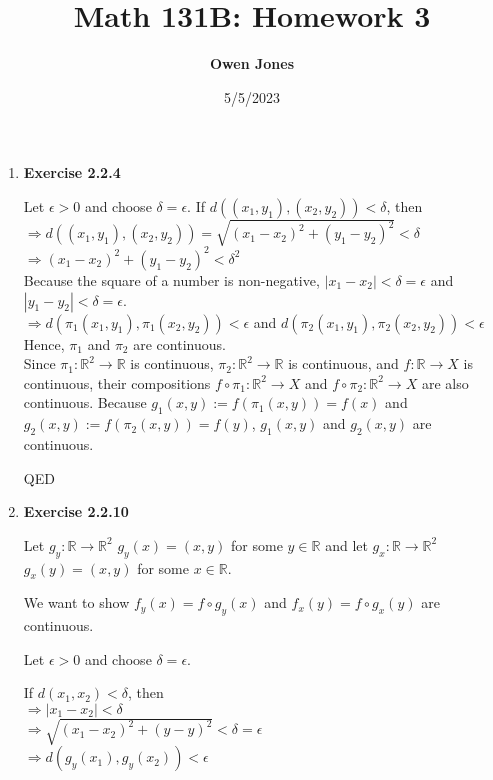 \documentclass[10pt]{article}
\title{\bf Math 131B: Homework 3}
\date{5/5/2023}
\author{\bf Owen Jones}
\begin{document}
\maketitle
\begin{enumerate}[label=Problem \arabic*.]
    \item \textbf{Exercise 2.2.4}\par 
        Let $\epsilon>0$ and choose $\delta=\epsilon$.
        If $d((x_1,y_1),(x_2,y_2))<\delta$, then\\ 
        $\Rightarrow d((x_1,y_1),(x_2,y_2))=\sqrt{(x_1-x_2)^2+(y_1-y_2)^2}<\delta$\\
        $\Rightarrow (x_1-x_2)^2+(y_1-y_2)^2<\delta^2$\\
        Because the square of a number is non-negative, $|x_1-x_2|<\delta=\epsilon$ and $|y_1-y_2|<\delta=\epsilon$.\\
        $\Rightarrow d(\pi_1(x_1,y_1),\pi_1(x_2,y_2))<\epsilon$ and $d(\pi_2(x_1,y_1),\pi_2(x_2,y_2))<\epsilon$\\
        Hence, $\pi_1$ and $\pi_2$ are continuous.\\
        Since $\pi_1:\mathbb{R}^2\rightarrow\mathbb{R}$ is continuous, $\pi_2:\mathbb{R}^2\rightarrow\mathbb{R}$ is continuous, and $f:\mathbb{R}\rightarrow X$ is continuous, their compositions $f\circ\pi_1:\mathbb{R}^2\rightarrow X$ and $f\circ\pi_2:\mathbb{R}^2\rightarrow X$ are also continuous. 
        Because $g_1(x,y):=f(\pi_1(x,y))=f(x)$ and $g_2(x,y):=f(\pi_2(x,y))=f(y)$, $g_1(x,y)$ and $g_2(x,y)$ are continuous.\par 
        QED
        \item \textbf{Exercise 2.2.10}\par 
        Let $g_{y}:\mathbb{R}\rightarrow \mathbb{R}^2$ $g_{y}(x)=(x,y)$ for some $y\in\mathbb{R}$ and let $g_{x}:\mathbb{R}\rightarrow \mathbb{R}^2$ $g_{x}(y)=(x,y)$ for some $x\in\mathbb{R}$.\par 
        We want to show $f_y(x)=f\circ g_{y}(x)$ and $f_x(y)=f\circ g_{x}(y)$ are continuous.\par 
        Let $\epsilon>0$ and choose $\delta=\epsilon$.\\    
        \begin{minipage}{0.5\textwidth}
            If $d(x_1,x_2)<\delta$, then\\ 
            $\Rightarrow |x_1-x_2|<\delta$\\
            $\Rightarrow \sqrt{(x_1-x_2)^2+(y-y)^2}<\delta=\epsilon$\\
            $\Rightarrow d(g_{y}(x_1),g_{y}(x_2))<\epsilon$\\

\end{minipage}
\end{enumerate}
\end{document}
